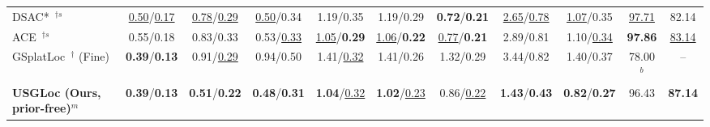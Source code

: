 \documentclass[journal]{IEEEtran}
\newcommand{\method}{USGLoc}
\begin{document}
\begin{table}[t]
\begin{tabular}{lcccccccc cc}
DSAC*~\cite{dsacstar}$^{\dagger s}$ & \underline{0.50}/\underline{0.17} & \underline{0.78}/\underline{0.29} & \underline{0.50}/0.34 & 1.19/0.35 & 1.19/0.29 & \textbf{0.72}/\textbf{0.21} & \underline{2.65}/\underline{0.78} & \underline{1.07}/0.35 & \underline{97.71} & 82.14\\
ACE~\cite{ace}$^{\dagger s}$ & 0.55/0.18 & 0.83/0.33 & 0.53/\underline{0.33} & \underline{1.05}/\textbf{0.29} & \underline{1.06}/\textbf{0.22} & \underline{0.77}/\textbf{0.21} & 2.89/0.81 & 1.10/\underline{0.34} & \textbf{97.86} & \underline{83.14}\\
GSplatLoc~\cite{gsplatloc}$^\dagger$ (Fine) & \textbf{0.39}/\textbf{0.13} & 0.91/\underline{0.29} & 0.94/0.50 & 1.41/\underline{0.32} & 1.41/0.26 & 1.32/0.29 & 3.44/0.82 & 1.40/0.37 & 78.00$^{b}$ & --\\
\textbf{\method{} (Ours, prior-free)}$^{m}$ & \textbf{0.39}/\textbf{0.13} & \textbf{0.51}/\textbf{0.22} & \textbf{0.48}/\textbf{0.31} & \textbf{1.04}/\underline{0.32} & \textbf{1.02}/\underline{0.23} & 0.86/\underline{0.22} & \textbf{1.43}/\textbf{0.43} & \textbf{0.82}/\textbf{0.27} & 96.43 & \textbf{87.14}\\
\bottomrule
\end{tabular}
\end{table}
\end{document}

